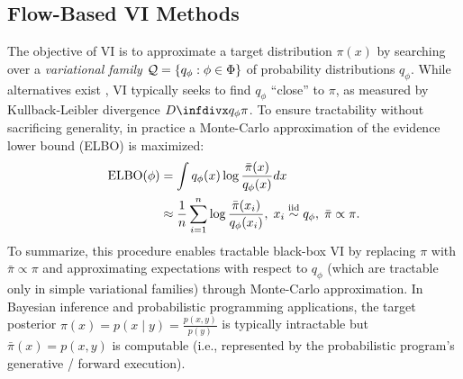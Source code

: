 \documentclass[nohyperref]{article}
\theoremstyle{plain}
\theoremstyle{definition}
\theoremstyle{remark}
\begin{document}

\vspace{-2mm}
\subsection{Flow-Based VI Methods} 

The objective of VI is to approximate a target distribution $\pi(x)$ by searching over
a \emph{variational family} $\mathcal{Q} = \{q_\phi : \phi \in \Phi\}$ of probability distributions $q_\phi$.
While alternatives exist \citep{li2016variational,wang2018variational}, VI typically
seeks to find $q_\phi$ ``close'' to $\pi$, as measured by Kullback-Leibler divergence $\infdiv{q_\phi}{\pi}$.
To ensure tractability without sacrificing generality, in practice \citep{wingate2013automated,ranganath2014black}
a Monte-Carlo approximation of the evidence lower bound (ELBO) is maximized:
\begin{align*}
  \text{ELBO}(\phi)
  &= \int q_\phi(x) \log \frac{\bar\pi(x)}{q_\phi(x)} dx\\
  & \approx \frac{1}{n} \sum_{i=1}^n \log \frac{\bar\pi(x_i)}{q_\phi(x_i)},\;
  x_i \overset{\text{iid}}{\sim} q_\phi,\;
  \bar{\pi} \propto \pi. 
\end{align*}
To summarize, this procedure enables tractable black-box VI
by replacing $\pi$ with $\bar\pi \propto \pi$ and approximating expectations with respect to $q_\phi$ (which are tractable only in simple variational families) through Monte-Carlo approximation. In Bayesian inference and probabilistic programming applications, the target posterior
$\pi(x) = p(x \mid y) = \frac{p(x, y)}{p(y)}$ is typically intractable but
$\bar\pi(x) = p(x,y)$ is computable (i.e., represented by the probabilistic program's
generative / forward execution).
\end{document}
